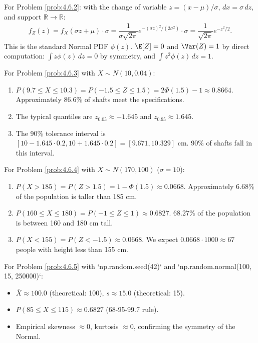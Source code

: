 \begin{solucion}
	\label{sol:4.6.2}
	For Problem \ref{prob:4.6.2}: with the change of variable $z = (x - \mu)/\sigma$, $dx = \sigma\,dz$, and support $\mathbb{R} \to \mathbb{R}$:
	\begin{align*}
		f_{Z}(z) = f_{X}(\sigma z + \mu) \cdot \sigma = \dfrac{1}{\sigma\sqrt{2\pi}} e^{-(\sigma z)^{2}/(2\sigma^{2})} \cdot \sigma = \dfrac{1}{\sqrt{2\pi}} e^{-z^{2}/2}.
	\end{align*}
	This is the standard Normal PDF $\phi(z)$. $\E[Z] = 0$ and $\Var(Z) = 1$ by direct computation: $\int z\phi(z)\,dz = 0$ by symmetry, and $\int z^{2}\phi(z)\,dz = 1$. \quad \qedhere
\end{solucion}

\begin{solucion}
	\label{sol:4.6.3}
	For Problem \ref{prob:4.6.3} with $X \sim N(10, 0.04)$:
	\begin{enumerate}
		\item $P(9.7 \le X \le 10.3) = P(-1.5 \le Z \le 1.5) = 2\Phi(1.5) - 1 \approx 0.8664$. Approximately 86.6\% of shafts meet the specifications.
		\item The typical quantiles are $z_{0.05} \approx -1.645$ and $z_{0.95} \approx 1.645$.
		\item The 90\% tolerance interval is $[10 - 1.645 \cdot 0.2, 10 + 1.645 \cdot 0.2] = [9.671, 10.329]$ cm. 90\% of shafts fall in this interval.
	\end{enumerate}
\end{solucion}

\begin{solucion}
	\label{sol:4.6.4}
	For Problem \ref{prob:4.6.4} with $X \sim N(170, 100)$ ($\sigma = 10$):
	\begin{enumerate}
		\item $P(X > 185) = P(Z > 1.5) = 1 - \Phi(1.5) \approx 0.0668$. Approximately 6.68\% of the population is taller than 185 cm.
		\item $P(160 \le X \le 180) = P(-1 \le Z \le 1) \approx 0.6827$. 68.27\% of the population is between 160 and 180 cm tall.
		\item $P(X < 155) = P(Z < -1.5) \approx 0.0668$. We expect $0.0668 \cdot 1000 \approx 67$ people with height less than 155 cm.
	\end{enumerate}
\end{solucion}

\begin{solucion}
	\label{sol:4.6.5}
	For Problem \ref{prob:4.6.5} with `np.random.seed(42)` and `np.random.normal(100, 15, 250000)`:
	\begin{itemize}
		\item $\bar{X} \approx 100.0$ (theoretical: 100), $s \approx 15.0$ (theoretical: 15).
		\item $P(85 \le X \le 115) \approx 0.6827$ (68-95-99.7 rule).
		\item Empirical skewness $\approx 0$, kurtosis $\approx 0$, confirming the symmetry of the Normal.
	\end{itemize}
\end{solucion}

